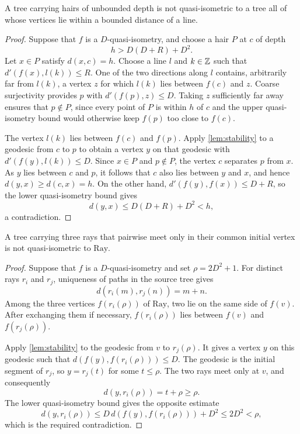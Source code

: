 \begin{theorem}
\label{thm:hair-separation}
\leanok
A tree carrying hairs of unbounded depth is not quasi-isometric to a tree all of whose
vertices lie within a bounded distance of a line.
\end{theorem}

\begin{proof}
\leanok
Suppose that $f$ is a $D$-quasi-isometry, and choose a hair $P$ at $c$ of depth
\[
  h>D(D+R)+D^2.
\]
Let $x\in P$ satisfy $d(x,c)=h$. Choose a line $l$ and $k\in\mathbb{Z}$ such that
$d'(f(x),l(k))\leq R$. One of the two directions along $l$ contains, arbitrarily far from
$l(k)$, a vertex $z$ for which $l(k)$ lies between $f(c)$ and $z$. Coarse surjectivity
provides $p$ with $d'(f(p),z)\leq D$. Taking $z$ sufficiently far away ensures that
$p\notin P$, since every point of $P$ is within $h$ of $c$ and the upper quasi-isometry
bound would otherwise keep $f(p)$ too close to $f(c)$.

The vertex $l(k)$ lies between $f(c)$ and $f(p)$. Apply \cref{lem:stability} to a geodesic
from $c$ to $p$ to obtain a vertex $y$ on that geodesic with
$d'(f(y),l(k))\leq D$. Since $x\in P$ and $p\notin P$, the vertex $c$ separates $p$ from
$x$. As $y$ lies between $c$ and $p$, it follows that $c$ also lies between $y$ and $x$,
and hence $d(y,x)\geq d(c,x)=h$. On the other hand,
$d'(f(y),f(x))\leq D+R$, so the lower quasi-isometry bound gives
\[
  d(y,x)\leq D(D+R)+D^2<h,
\]
a contradiction.
\end{proof}

\begin{theorem}
\label{thm:three-rays}
\leanok
A tree carrying three rays that pairwise meet only in their common initial vertex is not
quasi-isometric to $\mathrm{Ray}$.
\end{theorem}

\begin{proof}
\leanok
Suppose that $f$ is a $D$-quasi-isometry and set $\rho=2D^2+1$. For distinct rays $r_i$
and $r_j$, uniqueness of paths in the source tree gives
\[
  d(r_i(m),r_j(n))=m+n.
\]
Among the three vertices $f(r_i(\rho))$ of $\mathrm{Ray}$, two lie on the same side of
$f(v)$. After exchanging them if necessary, $f(r_i(\rho))$ lies between $f(v)$ and
$f(r_j(\rho))$.

Apply \cref{lem:stability} to the geodesic from $v$ to $r_j(\rho)$. It gives a vertex $y$
on this geodesic such that
$d(f(y),f(r_i(\rho)))\leq D$. The geodesic is the initial segment of $r_j$, so
$y=r_j(t)$ for some $t\leq\rho$. The two rays meet only at $v$, and consequently
\[
  d(y,r_i(\rho))=t+\rho\geq\rho.
\]
The lower quasi-isometry bound gives the opposite estimate
\[
  d(y,r_i(\rho))\leq D\,d(f(y),f(r_i(\rho)))+D^2
  \leq2D^2<\rho,
\]
which is the required contradiction.
\end{proof}
